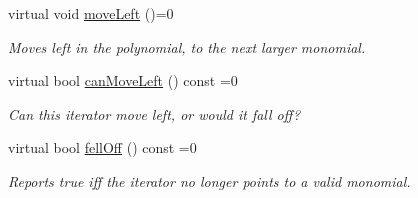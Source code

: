 \begin{Indent}
\begin{DoxyCompactItemize}
virtual void \hyperlink{class_polynomial___iterator_a47683fc8085c51bd14c5647a7e9e7e87}{move\+Left} ()=0
\begin{DoxyCompactList}\small\item\em Moves left in the polynomial, to the next larger monomial. \end{DoxyCompactList}\item 
\mbox{\label{class_polynomial___iterator_a7ab348897446bc182500f84df8a9e590}} 
virtual bool \hyperlink{class_polynomial___iterator_a7ab348897446bc182500f84df8a9e590}{can\+Move\+Left} () const =0
\begin{DoxyCompactList}\small\item\em Can this iterator move left, or would it fall off? \end{DoxyCompactList}\item 
virtual bool \hyperlink{class_polynomial___iterator_ac571e120134088d6067718bbad513e2d}{fell\+Off} () const =0
\begin{DoxyCompactList}\small\item\em Reports true iff the iterator no longer points to a valid monomial. \end{DoxyCompactList}\end{DoxyCompactItemize}
\end{Indent}
